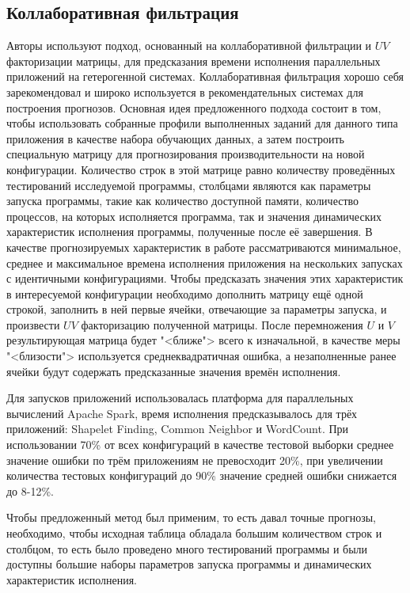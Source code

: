 	\subsection{Коллаборативная фильтрация}
		Авторы \cite{UV_matrix} используют подход, основанный на коллаборативной фильтрации и \(UV\) факторизации матрицы, для предсказания времени исполнения параллельных приложений на гетерогенной системах. Коллаборативная фильтрация хорошо себя зарекомендовал и широко используется в рекомендательных системах для построения прогнозов. Основная идея предложенного подхода состоит в том, чтобы использовать собранные профили выполненных заданий для данного типа приложения в качестве набора обучающих данных, а затем построить специальную матрицу для прогнозирования производительности на новой конфигурации. Количество строк в этой матрице равно количеству проведённых тестирований исследуемой программы, столбцами являются как параметры запуска программы, такие как количество доступной памяти, количество процессов, на которых исполняется программа, так и значения динамических характеристик исполнения программы, полученные после её завершения. В качестве прогнозируемых характеристик в работе рассматриваются минимальное, среднее и максимальное времена исполнения приложения на нескольких запусках с идентичными конфигурациями. Чтобы предсказать значения этих характеристик в интересуемой конфигурации необходимо дополнить матрицу ещё одной строкой, заполнить в ней первые ячейки, отвечающие за параметры запуска, и произвести \(UV\) факторизацию полученной матрицы. После перемножения \(U\) и \(V\) результирующая матрица будет "<ближе"> всего к изначальной, в качестве меры "<близости"> используется среднеквадратичная ошибка, а незаполненные ранее ячейки будут содержать предсказанные значения времён исполнения.

		Для запусков приложений использовалась платформа для параллельных вычислений Apache Spark, время исполнения предсказывалось для трёх приложений: Shapelet Finding, Common Neighbor и WordCount. При использовании 70\% от всех конфигураций в качестве тестовой выборки среднее значение ошибки по трём приложениям не превосходит 20\%, при увеличении количества тестовых конфигураций до 90\% значение средней ошибки снижается до 8-12\%.

		Чтобы предложенный метод был применим, то есть давал точные прогнозы, необходимо, чтобы исходная таблица обладала большим количеством строк и столбцом, то есть было проведено много тестирований программы и были доступны большие наборы параметров запуска программы и динамических характеристик исполнения.

